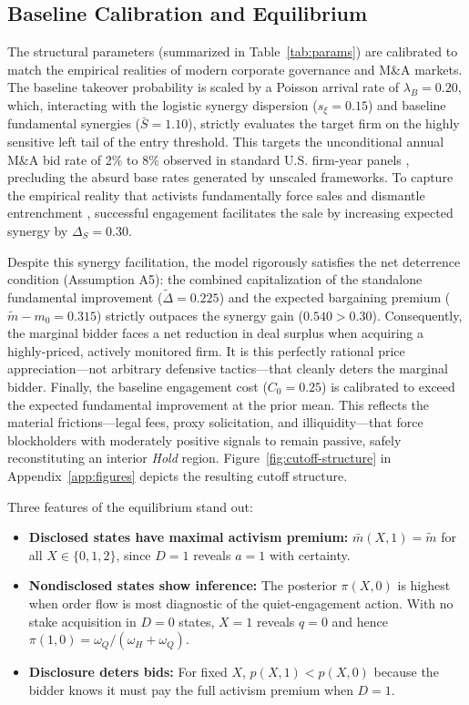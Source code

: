\documentclass[11pt]{article}
\newcommand{\1}{\mathbf{1}}
\begin{document}
%
\subsection{Baseline Calibration and Equilibrium}
%

The structural parameters (summarized in Table~\ref{tab:params}) are calibrated to match the empirical realities of modern corporate governance and M\&A markets. The baseline takeover probability is scaled by a Poisson arrival rate of $\lambda_B = 0.20$, which, interacting with the logistic synergy dispersion ($s_\xi = 0.15$) and baseline fundamental synergies ($\bar{S} = 1.10$), strictly evaluates the target firm on the highly sensitive left tail of the entry threshold. This targets the unconditional annual M\&A bid rate of 2\% to 8\% observed in standard U.S. firm-year panels \citep{BettonEckboThorburn2008}, precluding the absurd base rates generated by unscaled frameworks. To capture the empirical reality that activists fundamentally force sales and dismantle entrenchment \citep{GreenwoodSchor2009}, successful engagement facilitates the sale by increasing expected synergy by $\Delta_S = 0.30$.

Despite this synergy facilitation, the model rigorously satisfies the net deterrence condition (Assumption A5): the combined capitalization of the standalone fundamental improvement ($\tilde{\Delta} = 0.225$) and the expected bargaining premium ($\tilde{m}-m_0 = 0.315$) strictly outpaces the synergy gain ($0.540 > 0.30$). Consequently, the marginal bidder faces a net reduction in deal surplus when acquiring a highly-priced, actively monitored firm. It is this perfectly rational price appreciation---not arbitrary defensive tactics---that cleanly deters the marginal bidder. Finally, the baseline engagement cost ($C_0 = 0.25$) is calibrated to exceed the expected fundamental improvement at the prior mean. This reflects the material frictions---legal fees, proxy solicitation, and illiquidity---that force blockholders with moderately positive signals to remain passive, safely reconstituting an interior \textit{Hold} region. Figure~\ref{fig:cutoff-structure} in Appendix~\ref{app:figures} depicts the resulting cutoff structure.

Three features of the equilibrium stand out:
\begin{itemize}[leftmargin=2em,itemsep=2pt]
\item \textbf{Disclosed states have maximal activism premium:} $\bar{m}(X,1) = \tilde{m}$ for all $X \in \{0,1,2\}$, since $D=1$ reveals $a=1$ with certainty.
\item \textbf{Nondisclosed states show inference:} The posterior $\pi(X,0)$ is highest when order flow is most diagnostic of the quiet-engagement action. With no stake acquisition in $D=0$ states, $X=1$ reveals $q=0$ and hence $\pi(1,0)=\omega_Q/(\omega_H+\omega_Q)$.
\item \textbf{Disclosure deters bids:} For fixed $X$, $p(X,1) < p(X,0)$ because the bidder knows it must pay the full activism premium when $D=1$.
\end{itemize}
\end{document}
